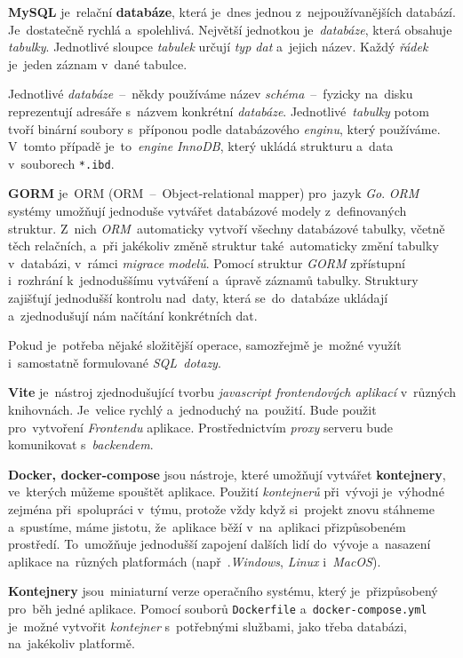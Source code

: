\documentclass[11pt,a4paper]{report}
\begin{document}
            \textbf{MySQL} je~relační \textbf{databáze}, která je~dnes jednou z~nejpoužívanějších databází. Je~dostatečně rychlá a~spolehlivá. Největší jednotkou je~\emph{databáze}, která obsahuje \emph{tabulky}. Jednotlivé sloupce \emph{tabulek} určují \emph{typ dat} a~jejich název. Každý \emph{řádek} je~jeden záznam v~dané tabulce.\cite{databases21}
            
            Jednotlivé \emph{databáze}~--~někdy používáme název \emph{schéma}~--~fyzicky na~disku reprezentují adresáře s~názvem konkrétní \emph{databáze}. Jednotlivé~\emph{tabulky} potom tvoří binární soubory s~příponou podle databázového \emph{enginu}, který používáme. V~tomto případě je~to~\emph{engine} \emph{InnoDB}, který ukládá strukturu a~data v~souborech \texttt{*.ibd}. \cite{MySQLInnoDB}
            
            \textbf{GORM} je~ORM (ORM~--~Object-relational mapper) pro~jazyk \emph{Go}. \emph{ORM} systémy umožňují jednoduše vytvářet databázové modely z~definovaných struktur. Z~nich \emph{ORM}~automaticky vytvoří všechny databázové tabulky, včetně těch relačních, a~při jakékoliv změně struktur také~automaticky změní tabulky v~databázi, v~rámci \emph{migrace modelů}. Pomocí struktur \emph{GORM} zpřístupní i~rozhrání k~jednoduššímu vytváření a~úpravě záznamů tabulky. Struktury zajišťují jednodušší kontrolu nad~daty, která se~do~databáze ukládají a~zjednodušují nám načítání konkrétních dat.

            Pokud je~potřeba nějaké složitější operace, samozřejmě je~možné využít i~samostatně formulované \emph{SQL~dotazy}. \cite{gormGORM, freecodecamp:orm}

            \textbf{Vite} je~nástroj zjednodušující tvorbu \emph{javascript frontendových aplikací} v~různých knihovnách. Je~velice rychlý a~jednoduchý na~použití. Bude použit pro~vytvoření \emph{Frontendu} aplikace. Prostřednictvím \emph{proxy} serveru bude komunikovat s~\emph{backendem}.

            \textbf{Docker, docker-compose} jsou nástroje, které umožňují vytvářet \textbf{kontejnery}, ve~kterých můžeme spouštět aplikace. Použití \emph{kontejnerů} při~vývoji je~výhodné zejména při~spolupráci v~týmu, protože vždy když si~projekt znovu stáhneme a~spustíme, máme jistotu, že~aplikace běží v~na~aplikaci přizpůsobeném prostředí. To~umožňuje jednodušší zapojení dalších lidí do~vývoje a~nasazení aplikace na~různých platformách (např~.\emph{Windows}, \emph{Linux} i~\emph{MacOS}).

            \textbf{Kontejnery} jsou~miniaturní verze operačního systému, který je~přizpůsobený pro~běh jedné aplikace. Pomocí souborů \texttt{Dockerfile} a~\texttt{docker-compose.yml} je~možné vytvořit \emph{kontejner} s~potřebnými službami, jako třeba databázi, na~jakékoliv platformě.
\end{document}
